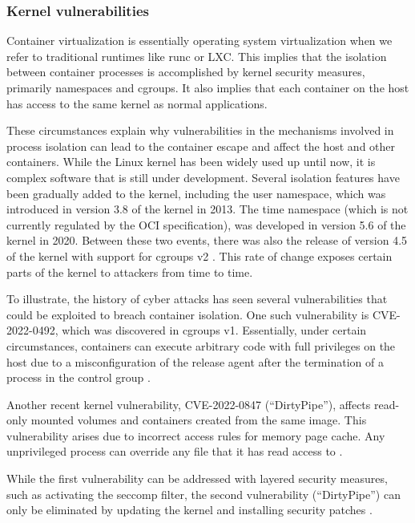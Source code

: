 \subsubsection{Kernel vulnerabilities}

Container virtualization is essentially operating system virtualization when we refer to traditional runtimes like runc or LXC. This implies that the isolation between container processes is accomplished by kernel security measures, primarily namespaces and cgroups. It also implies that each container on the host has access to the same kernel as normal applications. 

These circumstances explain why vulnerabilities in the mechanisms involved in process isolation can lead to the container escape and affect the host and other containers. While the Linux kernel has been widely used up until now, it is complex software that is still under development. Several isolation features have been gradually added to the kernel, including the user namespace, which was introduced in version 3.8 of the kernel in 2013. The time namespace (which is not currently regulated by the OCI specification), was developed in version 5.6 of the kernel in 2020. Between these two events, there was also the release of version 4.5 of the kernel with support for cgroups v2 \cite{s:linux38,s:linux45,s:linux56}. This rate of change exposes certain parts of the kernel to attackers from time to time.

To illustrate, the history of cyber attacks has seen several vulnerabilities that could be exploited to breach container isolation. One such vulnerability is CVE-2022-0492, which was discovered in cgroups v1. Essentially, under certain circumstances, containers can execute arbitrary code with full privileges on the host due to a misconfiguration of the release agent after the termination of a process in the control group \cite{s:CVE-2022-0492}.

Another recent kernel vulnerability, CVE-2022-0847 (``DirtyPipe''), affects read-only mounted volumes and containers created from the same image. This vulnerability arises due to incorrect access rules for memory page cache. Any unprivileged process can override any file that it has read access to \cite{aqua:dirtypipe}.

While the first vulnerability can be addressed with layered security measures, such as activating the seccomp filter, the second vulnerability (``DirtyPipe'') can only be eliminated by updating the kernel and installing security patches \cite{aqua:dirtypipe1}.

